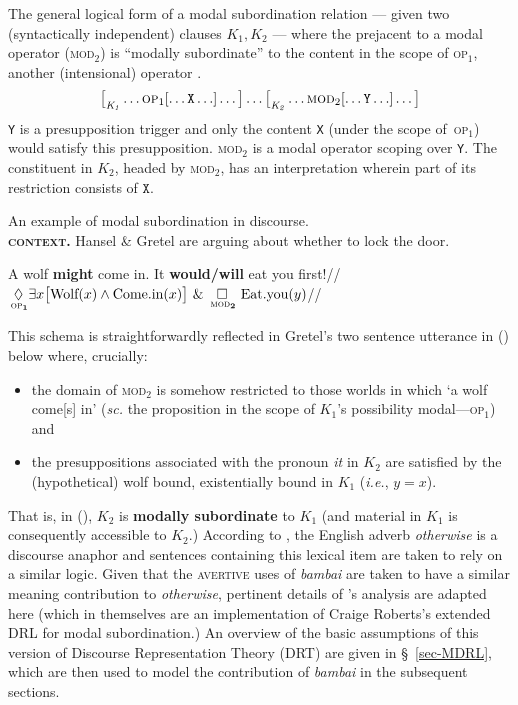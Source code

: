 \pex[labeltype=numeric,everylabel=\small] The general logical form of a modal subordination relation --- given two (syntactically independent) clauses $ \mathit{K_1,K_2} $ --- where the prejacent to a modal operator (\textsc{mod}$ _2 $) is ``modally subordinate'' to the content in the scope of \textsc{op}$ _1 $, another (intensional) operator \citep{Roberts2020}.
 $$ \big[_{\mathit{K_1}}\hdots \textsc{op}_1[\hdots \mathtt{X}\hdots]\hdots\big]\hdots\big[_{\mathit{K_2}}\hdots\textsc{mod}_2[\hdots\mathtt{Y}\hdots]\hdots\big] $$
\a\texttt{Y} is a presupposition trigger and only the content \texttt{X} (under the scope of~\textsc{op}$ _1 $) would satisfy this presupposition.
\a \textsc{mod}$ _{2} $ is a modal operator scoping over \texttt{Y}.
\a The constituent in $\mathit{K_2} $, headed by \textsc{mod}$ _2 $, has an interpretation wherein part of its restriction consists of $ \mathtt{X} $.
\xe


\pex[everylabel=\bf\sc] An example of modal subordination in discourse.\\
\textbf{\textsc{context.}} Hansel \& Gretel are arguing about whether to lock the door.

\a[label=g] \begingl\gla A wolf \textbf{might} come in. It \textbf{would/will} eat you first!//
\glft $ \boldsymbol{\underset{\,\textsc{op}_1}{\lozenge}}\exists x\big[\text{Wolf}(x)\wedge\text{Come.in}(x)\big]\ \&\ \boldsymbol{\underset{\,\textsc{mod}_2}{\square}}\ \text{Eat.you}(y) $//\endgl
\xe


\noindent This schema is straightforwardly reflected in Gretel's two sentence utterance in () below where, crucially:\begin{itemize} \item the domain of \textsc{mod}$ _2 $ is somehow restricted to those worlds in which `a wolf come[s] in' (\textit{sc.} the proposition in the scope of $ \mathit{K_1} $'s possibility modal---\textsc{op}$ _{1} $) and \item the presuppositions associated with the pronoun \textit{it} in $ \mathit{K_2} $ are satisfied by the (hypothetical) wolf bound, existentially bound in $ \mathit{K_1} $ (\textit{i.e.}, $ y=x $).\end{itemize}

\noindent That is, in (), $ \mathit{K_2} $ is \textbf{modally subordinate} to $ \mathit{K_1} $ (and material in $ \mathit{K_1} $ is consequently accessible to $ \mathit{K_2} $.) According to \citet{PhilKotek}, the English adverb \textit{otherwise} is a discourse anaphor and sentences containing this lexical item are taken to rely on a similar logic. Given that the \textsc{avertive} uses of \textit{bambai} are taken to have a similar meaning contribution to \textit{otherwise}, pertinent details of \citet{PhilKotek}'s analysis are adapted here (which in themselves are an implementation of Craige Roberts's extended DRL for modal subordination.) An overview of the basic assumptions of this version of Discourse Representation Theory (DRT) are given in \S~\ref{sec-MDRL}, which are then used to model the contribution of \textit{bambai} in the subsequent sections.


